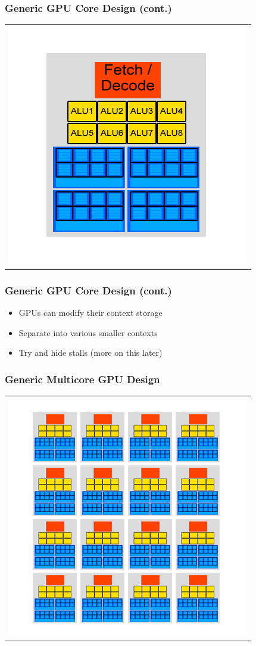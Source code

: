 \documentclass{beamer}
\begin{document}
\begin{frame}
	\frametitle{Generic GPU Core Design (cont.)}
	\begin{tabular}{c}
		\includegraphics[width=.75\textwidth]{GPU-Design---multiple-contexts.jpg}
	\end{tabular}
\end{frame}

\begin{frame}
	\frametitle{Generic GPU Core Design (cont.)}
	\begin{itemize}
		\item GPUs can modify their context storage 
		\item Separate into various smaller contexts
		\item Try and hide stalls (more on this later)
	\end{itemize}
\end{frame}

\begin{frame}
	\frametitle{Generic Multicore GPU Design}
	\begin{tabular}{c}
		\includegraphics[width=.75\textwidth]{GPU-Design---multiple-cores.jpg}
	\end{tabular}
\end{frame}
\end{document}
